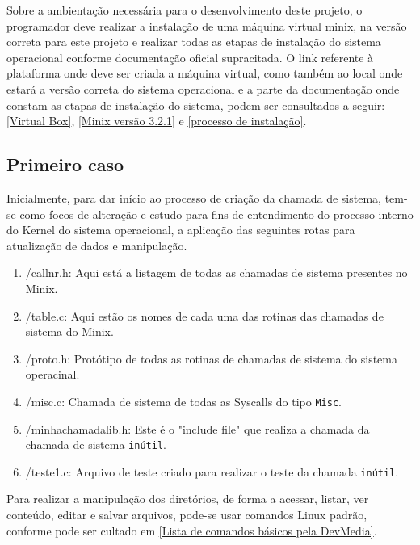 \documentclass[12pt]{article}
\begin{document}
Sobre a ambientação necessária para o desenvolvimento deste projeto, o programador deve realizar a instalação de uma máquina virtual minix, na versão correta para este projeto
e realizar todas as etapas de instalação do sistema operacional conforme documentação oficial supracitada. O link referente à plataforma onde deve ser criada a máquina virtual,
como também ao local onde estará a versão correta do sistema operacional e a parte da documentação onde constam as etapas de instalação do sistema, podem ser consultados a seguir:
\href{https://www.virtualbox.org/wiki/Downloads}{[Virtual Box]}, \href{https://wiki.minix3.org/doku.php?id=www:download:start}{[Minix versão 3.2.1]} e \href{https://wiki.minix3.org/doku.php?id=usersguide:runningonvirtualbox}{[processo de instalação]}.


\subsection{Primeiro caso} \label{sec:1sec}
Inicialmente, para dar início ao processo de criação da chamada de sistema, tem-se como focos de alteração e estudo para fins de entendimento do processo interno do
Kernel do sistema operacional, a aplicação das seguintes rotas para atualização de dados e manipulação.

\begin{enumerate}
    \item \label{callnr} /callnr.h: Aqui está a listagem de todas as chamadas de sistema presentes no Minix.
    \item  \label{table} /table.c: Aqui estão os nomes de cada uma das rotinas das chamadas de sistema do Minix.
    \item  \label{proto} /proto.h: Protótipo de todas as rotinas de chamadas de sistema do sistema operacinal.
    \item  \label{misc} /misc.c: Chamada de sistema de todas as Syscalls do tipo \texttt{Misc}.
    \item  \label{minhachamadalib} /minhachamadalib.h: Este é o "include file" que realiza a chamada da chamada de sistema \texttt{inútil}.
    \item  \label{teste1} /teste1.c: Arquivo de teste criado para realizar o teste da chamada \texttt{inútil}.
\end{enumerate}

Para realizar a manipulação dos diretórios, de forma a acessar, listar, ver conteúdo, editar e salvar arquivos, pode-se usar comandos Linux padrão, conforme pode ser
cultado em \href{https://www.devmedia.com.br/comandos-importantes-linux/23893}{[Lista de comandos básicos pela DevMedia]}.
\end{document}
